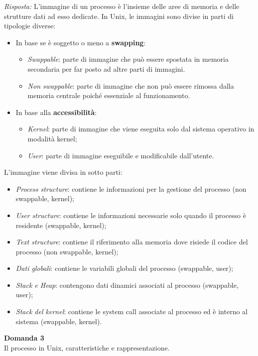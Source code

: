 \documentclass{article}
\newenvironment{problem}[2][Domanda]
    { \begin{mdframed}[backgroundcolor=gray!20] \textbf{#1 #2} \\}
    {  \end{mdframed}}
\newenvironment{solution}
    {\textit{Risposta:}}
    {}
\begin{document}
\begin{solution}
L’immagine di un processo è l’insieme delle aree di memoria e delle strutture dati ad esso dedicate. In Unix, le immagini sono divise in parti di tipologie diverse:
\begin{itemize}
    \item In base se è soggetto o meno a \textbf{swapping}:
    \begin{itemize}
        \item \emph{Swappable}: parte di immagine che può essere spostata in memoria secondaria per far posto ad altre parti di immagini.
        \item \emph{Non swappable}: parte di immagine che non può essere rimossa dalla memoria centrale poiché essenziale al funzionamento.
    \end{itemize}
    \item In base alla \textbf{accessibilità}:
    \begin{itemize}
        \item \emph{Kernel}: parte di immagine che viene eseguita solo dal sistema operativo in modalità kernel;
        \item \emph{User}: parte di immagine eseguibile e modificabile dall’utente.
    \end{itemize}
\end{itemize}
L’immagine viene divisa in sotto parti:
\begin{itemize}
    \item \emph{Process structure}: contiene le informazioni per la gestione del processo (non swappable, kernel);
    \item \emph{User structure}: contiene le informazioni necessarie solo quando il processo è residente (swappable, kernel);
    \item \emph{Text structure}: contiene il riferimento alla memoria dove risiede il codice del processo (non swappable, kernel);
    \item \emph{Dati globali}: contiene le variabili globali del processo (swappable, user);
    \item \emph{Stack e Heap}: contengono dati dinamici associati al processo (swappable, user); 
    \item \emph{Stack del kernel}: contiene le system call associate al processo ed è interno al sistema (swappable, kernel).
\end{itemize}
\newpage
\end{solution}
\begin{problem}{3}
Il processo in Unix, caratteristiche e rappresentazione.
\end{problem}
\end{document}
